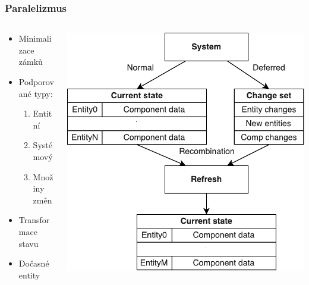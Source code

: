 \documentclass[10pt,xcolor=pdflatex, notes=only]{beamer}
\begin{document}
	\frametitle{Paralelizmus}
	\begin{columns}[t, onlytextwidth]
		\begin{column}{0.5\textwidth}
			\begin{itemize}
				\item Minimalizace zámků
				\item Podporované typy:
				\begin{enumerate}
					\item Entitní
					\item Systémový
					\item Množiny změn
				\end{enumerate}
				\item Transformace stavu
				\item Dočasné entity
			\end{itemize}
		\end{column}
		\begin{column}{0.5\textwidth}
			\begin{center}
				\includegraphics[width=\textwidth]{parallelism}
			\end{center}
		\end{column}
	\end{columns}
\end{document}
